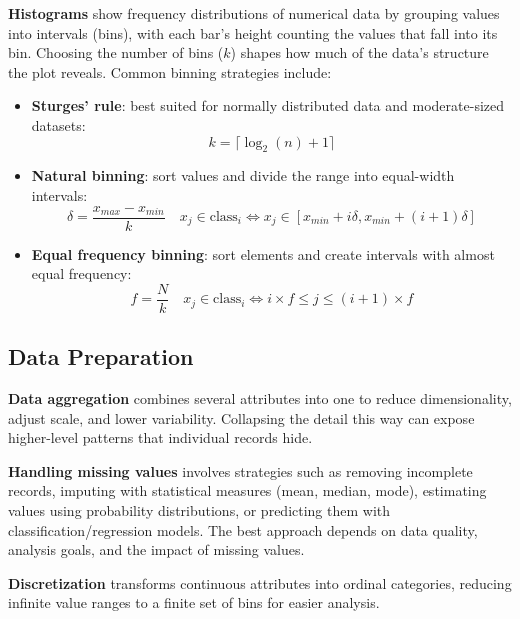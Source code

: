 \textbf{Histograms} show frequency distributions of numerical data by grouping values into intervals (bins), with each bar's height counting the values that fall into its bin. Choosing the number of bins ($k$) shapes how much of the data's structure the plot reveals. Common binning strategies include:


\begin{itemize}
    \item \textbf{Sturges' rule}: best suited for normally distributed data and moderate-sized datasets:
    \begin{equation}
        k = \lceil \log_2(n) +1\rceil
    \end{equation}
    
    \item \textbf{Natural binning}: sort values and divide the range into equal-width intervals:
    \begin{equation}
        \delta = \frac{x_{max}-x_{min}}{k}
        \quad x_j \in \text{class}_i \Leftrightarrow
        x_j \in [x_{min}+i\delta, x_{min}+(i+1)\delta]
    \end{equation}
    
    \item \textbf{Equal frequency binning}: sort elements and create intervals with almost equal frequency:
    \begin{equation}
        f = \frac{N}{k}
        \quad x_j \in \text{class}_i \Leftrightarrow
        i \times f \leq j \leq (i+1) \times f
    \end{equation}
\end{itemize}
\subsection{Data Preparation}
\textbf{Data aggregation} combines several attributes into one to reduce dimensionality, adjust scale, and lower variability. Collapsing the detail this way can expose higher-level patterns that individual records hide.

\textbf{Handling missing values} involves strategies such as removing incomplete records, imputing with statistical measures (mean, median, mode), estimating values using probability distributions, or predicting them with classification/regression models. The best approach depends on data quality, analysis goals, and the impact of missing values.

\textbf{Discretization} transforms continuous attributes into ordinal categories, reducing infinite value ranges to a finite set of bins for easier analysis.

